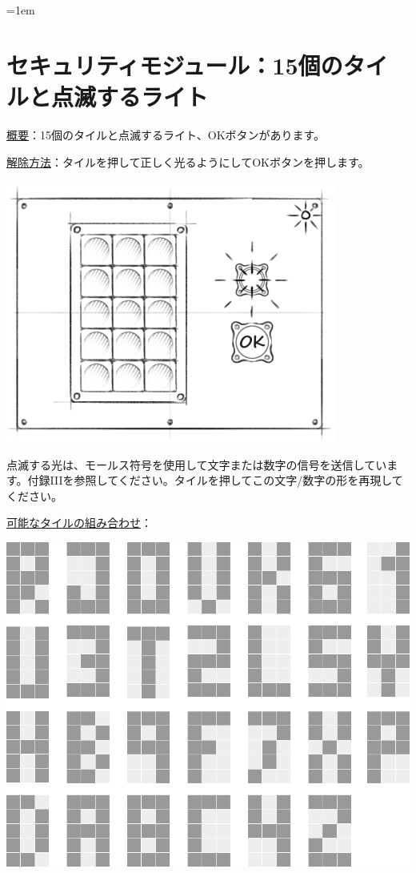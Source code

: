 \begin{minipage}{0.63\textwidth}
    \parskip=1em
    \section*{セキュリティモジュール：15個のタイルと点滅するライト}
    
    \uline{概要}：15個のタイルと点滅するライト{、}OKボタンがあります。
    
    \uline{解除方法}：タイルを押して正しく光るようにしてOKボタンを押します。
\end{minipage}%
\hfill%
\begin{minipage}{0.33\textwidth}
    \includegraphics[width=\textwidth]{images/7.png}
    \vspace*{\fill}
\end{minipage}

点滅する光は、モールス符号を使用して文字または数字の信号を送信しています。付録IIIを参照してください。タイルを押してこの文字/数字の形を再現してください。

\uline{可能なタイルの組み合わせ}：

\includegraphics[width=\textwidth]{images/5.png}